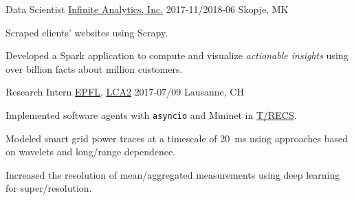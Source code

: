 \documentclass[%
version=last,%
fontsize=11pt,%
paper=A4,%
areasetadvanced,%
headinclude=false,%
footinclude=false,%
headlines=0,%
footlines=0,%
toc=bibnumbered,%
]{scrartcl}
\begin{document}
\begin{minipage}[t]{0.575\textwidth}
  \WorkEntry%
  {Data Scientist}%
  {\href{http://infiniteanalytics.com/}{Infinite Analytics, Inc.}}%
  {2017-11/2018-06}%
  {Skopje, MK}%
  {%
    \begin{Items}
    \item Scraped clients’ websites using Scrapy.
    \item Developed a Spark application to compute and visualize
      \emph{actionable insights} using over  billion facts about
       million customers.
    \end{Items}%
  }

  \WorkEntry%
  {Research Intern}%
  {\href{https://epfl.ch/}{EPFL}, \href{http://lca.epfl.ch/}{LCA2}}%
  {2017-07/09}%
  {Lausanne, CH}%
  {%
    \begin{Items}
    \item Implemented software agents with \texttt{asyncio} and
      Mininet in
      \href{https://www.epfl.ch/labs/desl-pwrs/smartgrid/t-recs/}{T\=/RECS}.
    \item Modeled smart grid power traces at a timescale of \SI{20}{\ms} using
      approaches based on wavelets and long\-/range dependence.
    \item Increased the resolution of mean\-/aggregated measurements using deep
      learning for super\-/resolution.
    \end{Items}%
  }
\end{minipage}%
\hfill%
\end{document}
